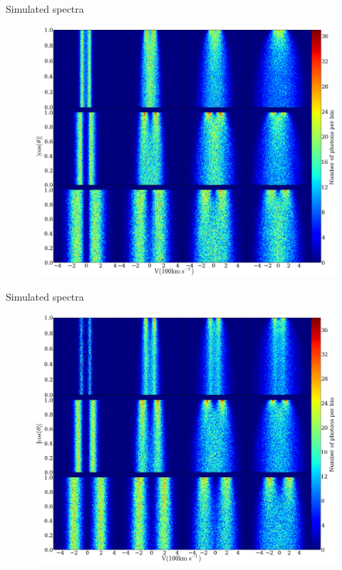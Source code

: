 \documentclass{beamer}
\begin{document}
\begin{frame}{Simulated spectra}
\begin{figure}
\includegraphics[scale=0.16]{Figures/f2.png}
\end{figure}
\end{frame}

\begin{frame}{Simulated spectra}
\begin{figure}
\includegraphics[scale=0.16]{Figures/f3.png}
\end{figure}
\end{frame}
\end{document}

